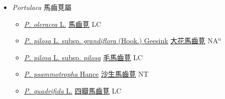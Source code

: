 
  \begin{itemize}
 \item[] \textit{Portulaca} 馬齒莧屬
                    
  \begin{itemize}
        \item[] \href{http://www.theplantlist.org/tpl1.1/search?q=Portulaca+oleracea}{\textit{P. oleracea} L.}   \href{\detokenize{http://taibnet.sinica.edu.tw/chi/taibnet_species_list.php?T2=馬齒莧&T2_new_value=true&fr=y}}{馬齒莧} LC
        \item[] \href{http://www.theplantlist.org/tpl1.1/search?q=Portulaca+pilosa+subsp.+grandiflora}{\textit{P. pilosa} L. subsp. \textit{grandiflora} (Hook.) Geesink}   \href{\detokenize{http://taibnet.sinica.edu.tw/chi/taibnet_species_list.php?T2=大花馬齒莧&T2_new_value=true&fr=y}}{大花馬齒莧} NA$^n$
        \item[] \href{http://www.theplantlist.org/tpl1.1/search?q=Portulaca+pilosa+subsp.+pilosa}{\textit{P. pilosa} L. subsp. \textit{pilosa}}   \href{\detokenize{http://taibnet.sinica.edu.tw/chi/taibnet_species_list.php?T2=毛馬齒莧&T2_new_value=true&fr=y}}{毛馬齒莧} LC
        \item[] \href{http://www.theplantlist.org/tpl1.1/search?q=Portulaca+psammotropha}{\textit{P. psammotropha} Hance}   \href{\detokenize{http://taibnet.sinica.edu.tw/chi/taibnet_species_list.php?T2=沙生馬齒莧&T2_new_value=true&fr=y}}{沙生馬齒莧} NT
        \item[] \href{http://www.theplantlist.org/tpl1.1/search?q=Portulaca+quadrifida}{\textit{P. quadrifida} L.}   \href{\detokenize{http://taibnet.sinica.edu.tw/chi/taibnet_species_list.php?T2=四瓣馬齒莧&T2_new_value=true&fr=y}}{四瓣馬齒莧} LC
  \end{itemize}
  \end{itemize}
